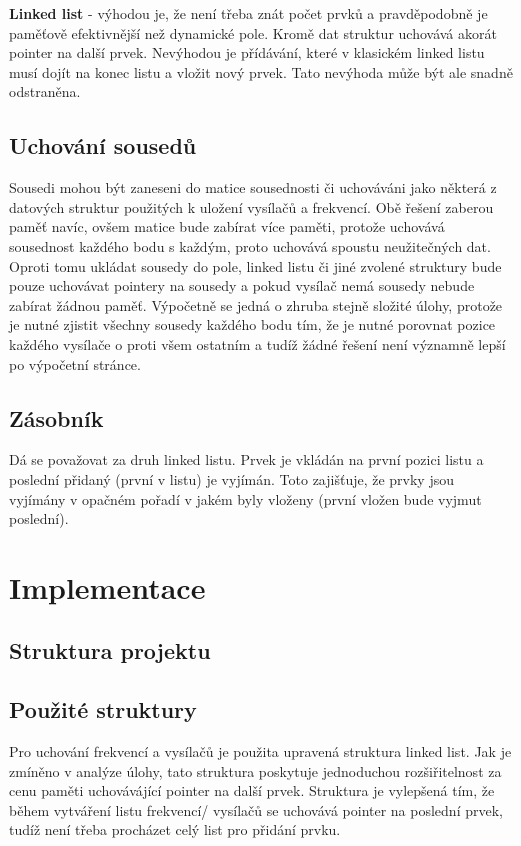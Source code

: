\documentclass[12pt]{article}
\begin{document}
\textbf{Linked list} - výhodou je, že není třeba znát počet prvků a 
pravděpodobně je paměťově efektivnější než dynamické pole. Kromě dat struktur 
uchovává akorát pointer na další prvek. Nevýhodou je přídávání, které v 
klasickém linked listu musí dojít na konec listu a vložit nový prvek. Tato 
nevýhoda může být ale snadně odstraněna.
%
\subsection{Uchování sousedů}
%
Sousedi mohou být zaneseni do matice sousednosti či uchováváni jako některá z 
datových struktur použitých k uložení vysílačů a frekvencí. Obě řešení 
zaberou paměť navíc, ovšem matice bude zabírat více paměti, protože uchovává 
sousednost každého bodu s každým, proto uchovává spoustu neužitečných dat. 
Oproti tomu ukládat sousedy do pole, linked listu či jiné zvolené struktury 
bude pouze uchovávat pointery na sousedy a pokud vysílač nemá sousedy nebude 
zabírat žádnou paměť. Výpočetně se jedná o zhruba stejně složité úlohy, protože
je nutné zjistit všechny sousedy každého bodu tím, že je nutné porovnat pozice
každého vysílače o proti všem ostatním a tudíž žádné řešení není významně lepší
po výpočetní stránce.
%
\subsection{Zásobník}
%
Dá se považovat za druh linked listu. Prvek je vkládán na první pozici listu a 
poslední přidaný (první v listu) je vyjímán. Toto zajišťuje, že prvky jsou 
vyjímány v opačném pořadí v jakém byly vloženy (první vložen bude vyjmut 
poslední).
%
%
\section{Implementace}
%
\subsection{Struktura projektu}
%
%
\subsection{Použité struktury}
%
Pro uchování frekvencí a vysílačů je použita upravená struktura linked list.
Jak je zmíněno v analýze úlohy, tato struktura poskytuje jednoduchou
rozšiřitelnost za cenu paměti uchovávájící pointer na další prvek. Struktura
je vylepšená tím, že během vytváření listu frekvencí/ vysílačů se uchovává 
pointer na poslední prvek, tudíž není třeba procházet celý list pro přidání
prvku.\\
\end{document}
